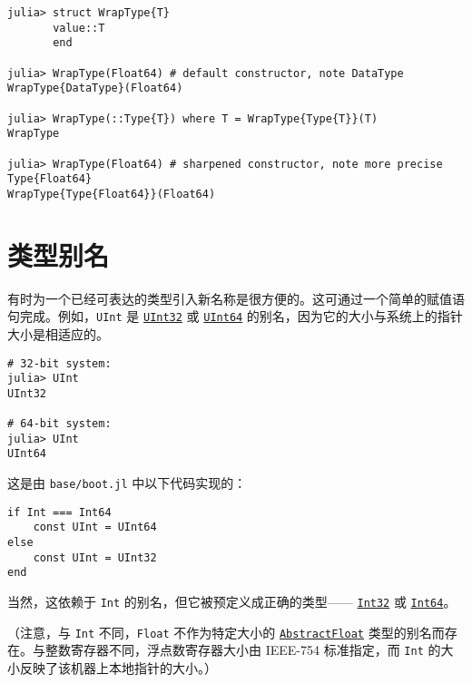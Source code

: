 \begin{verbatim}
julia> struct WrapType{T}
       value::T
       end

julia> WrapType(Float64) # default constructor, note DataType
WrapType{DataType}(Float64)

julia> WrapType(::Type{T}) where T = WrapType{Type{T}}(T)
WrapType

julia> WrapType(Float64) # sharpened constructor, note more precise Type{Float64}
WrapType{Type{Float64}}(Float64)
\end{verbatim}



\hypertarget{11325503690546832900}{}


\section{类型别名}



有时为一个已经可表达的类型引入新名称是很方便的。这可通过一个简单的赋值语句完成。例如，\texttt{UInt} 是 \hyperlink{8690996847580776341}{\texttt{UInt32}} 或 \hyperlink{5500998675195555601}{\texttt{UInt64}} 的别名，因为它的大小与系统上的指针大小是相适应的。




\begin{verbatim}
# 32-bit system:
julia> UInt
UInt32

# 64-bit system:
julia> UInt
UInt64
\end{verbatim}



这是由 \texttt{base/boot.jl} 中以下代码实现的：




\begin{verbatim}
if Int === Int64
    const UInt = UInt64
else
    const UInt = UInt32
end
\end{verbatim}



当然，这依赖于 \texttt{Int} 的别名，但它被预定义成正确的类型—— \hyperlink{10103694114785108551}{\texttt{Int32}} 或 \hyperlink{7720564657383125058}{\texttt{Int64}}。



（注意，与 \texttt{Int} 不同，\texttt{Float} 不作为特定大小的 \hyperlink{11465394427882483091}{\texttt{AbstractFloat}} 类型的别名而存在。与整数寄存器不同，浮点数寄存器大小由 IEEE-754 标准指定，而 \texttt{Int} 的大小反映了该机器上本地指针的大小。）



